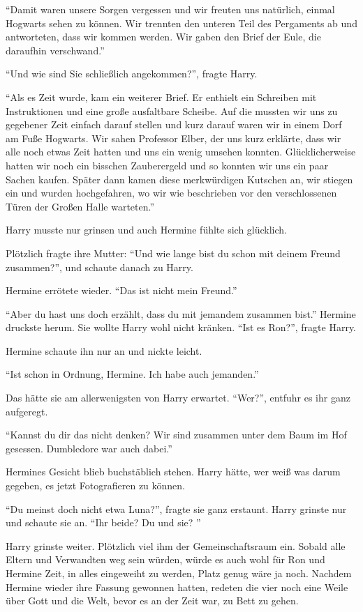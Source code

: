 \enquote{Damit waren unsere Sorgen vergessen und wir freuten uns natürlich, einmal Hogwarts sehen zu können. Wir trennten den unteren Teil des Pergaments ab und antworteten, dass wir kommen werden. Wir gaben den Brief der Eule, die daraufhin verschwand.}

\enquote{Und wie sind Sie schließlich angekommen?}, fragte Harry.

\enquote{Als es Zeit wurde, kam ein weiterer Brief. Er enthielt ein Schreiben mit Instruktionen und eine große ausfaltbare Scheibe. Auf die mussten wir uns zu gegebener Zeit einfach darauf stellen und kurz darauf waren wir in einem Dorf am Fuße Hogwarts. Wir sahen Professor Elber, der uns kurz erklärte, dass wir alle noch etwas Zeit hatten und uns ein wenig umsehen konnten. Glücklicherweise hatten wir noch ein bisschen Zauberergeld und so konnten wir uns ein paar Sachen kaufen. Später dann kamen diese merkwürdigen Kutschen an, wir stiegen ein und wurden hochgefahren, wo wir wie beschrieben vor den verschlossenen Türen der Großen Halle warteten.}

Harry musste nur grinsen und auch Hermine fühlte sich glücklich.

Plötzlich fragte ihre Mutter: \enquote{Und wie lange bist du schon mit deinem Freund zusammen?}, und schaute danach zu Harry.

Hermine errötete wieder. \enquote{Das ist nicht mein Freund.}

\enquote{Aber du hast uns doch erzählt, dass du mit jemandem zusammen bist.} Hermine druckste herum. Sie wollte Harry wohl nicht kränken. \enquote{Ist es Ron?}, fragte Harry.

Hermine schaute ihn nur an und nickte leicht.

\enquote{Ist schon in Ordnung, Hermine. Ich habe auch jemanden.}

Das hätte sie am allerwenigsten von Harry erwartet. \enquote{Wer?}, entfuhr es ihr ganz aufgeregt.

\enquote{Kannst du dir das nicht denken? Wir sind zusammen unter dem Baum im Hof gesessen. Dumbledore war auch dabei.}

Hermines Gesicht blieb buchstäblich stehen. Harry hätte, wer weiß was darum gegeben, es jetzt Fotografieren zu können.

\enquote{Du meinst doch nicht etwa Luna?}, fragte sie ganz erstaunt. Harry grinste nur und schaute sie an. \enquote{Ihr beide? Du und sie? \gst}

Harry grinste weiter. Plötzlich viel ihm der Gemeinschaftsraum ein. Sobald alle Eltern und Verwandten weg sein würden, würde es auch wohl für Ron und Hermine Zeit, in alles eingeweiht zu werden, Platz genug wäre ja noch. Nachdem Hermine wieder ihre Fassung gewonnen hatten, redeten die vier noch eine Weile über Gott und die Welt, bevor es an der Zeit war, zu Bett zu gehen.

